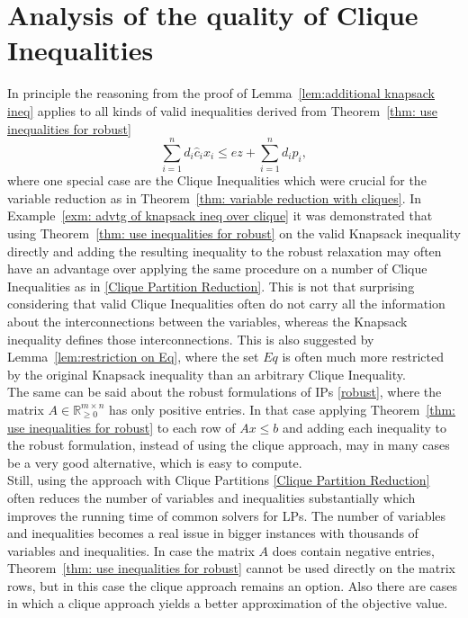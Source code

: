 \documentclass[titlepage, a4paper]{amsbook}
\theoremstyle{plain}
\theoremstyle{break}
\theoremstyle{definition}
\theoremstyle{remark}
\numberwithin{equation}{thm}
\begin{document}
\section{Analysis of the quality of Clique Inequalities}
In principle the reasoning from the proof of Lemma~\ref{lem:additional knapsack ineq} applies to all kinds of valid inequalities derived from Theorem~\ref{thm: use inequalities for robust}
\[\sum_{i=1}^n d_i \hat{c}_i x_i \leq e z + \sum_{i=1}^n d_i p_i,\]
where one special case are the Clique Inequalities which were crucial for the variable reduction as in Theorem~\ref{thm: variable reduction with cliques}. In Example~\ref{exm: advtg of knapsack ineq over clique} it was demonstrated that using Theorem~\ref{thm: use inequalities for robust} on the valid Knapsack inequality directly and adding the resulting inequality to the robust relaxation may often have an advantage over applying the same procedure on a number of Clique Inequalities as in \eqref{Clique Partition Reduction}.
This is not that surprising considering that valid Clique Inequalities often do not carry all the information about the interconnections between the variables, whereas the Knapsack inequality defines those interconnections. This is also suggested by Lemma~\ref{lem:restriction on Eq}, where the set $Eq$ is often much more restricted by the original Knapsack inequality than an arbitrary Clique Inequality. \\
The same can be said about the robust formulations of IPs
\eqref{robust}, where the matrix $A \in \mathbb{R}^{m \times n}_{\geq 0}$ has only positive entries. In that case applying Theorem~\ref{thm: use inequalities for robust} to each row of $Ax \leq b$ and adding each inequality to the robust formulation, instead of using the clique approach, may in many cases be a very good alternative, which is easy to compute.   \\
Still, using the approach with Clique Partitions \eqref{Clique Partition Reduction} often reduces the number of variables and inequalities substantially which improves the running time of common solvers for LPs. The number of variables and inequalities becomes a real issue in bigger instances with thousands of variables and inequalities. In case the matrix $A$ does contain negative entries, Theorem~\ref{thm: use inequalities for robust} cannot be used directly on the matrix rows, but in this case the clique approach remains an option. Also there are cases in which a clique approach yields a better approximation of the objective value.
\end{document}
